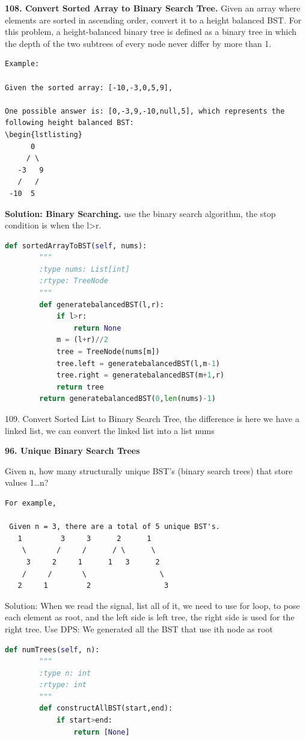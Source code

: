 \documentclass[../main.tex]{subfiles}
\begin{document}
\begin{examples}[resume]
\item \textbf{108. Convert Sorted Array to Binary Search Tree.} Given an array where elements are sorted in ascending order, convert it to a height balanced BST. For this problem, a height-balanced binary tree is defined as a binary tree in which the depth of the two subtrees of every node never differ by more than 1.
\begin{lstlisting}[numbers=none]
Example:

Given the sorted array: [-10,-3,0,5,9],

One possible answer is: [0,-3,9,-10,null,5], which represents the following height balanced BST:
\begin{lstlisting}
      0
     / \
   -3   9
   /   /
 -10  5
\end{lstlisting}

\textbf{Solution: Binary Searching.} use the binary search algorithm, the stop condition is when the l>r.
\begin{lstlisting}[language = Python]
def sortedArrayToBST(self, nums):
        """
        :type nums: List[int]
        :rtype: TreeNode
        """
        def generatebalancedBST(l,r):
            if l>r:
                return None
            m = (l+r)//2
            tree = TreeNode(nums[m])
            tree.left = generatebalancedBST(l,m-1)
            tree.right = generatebalancedBST(m+1,r)
            return tree
        return generatebalancedBST(0,len(nums)-1)
\end{lstlisting}

109. Convert Sorted List to Binary Search Tree, the difference is here we have a linked list, we can convert the linked list into a list nums

\item \textbf{96. Unique Binary Search Trees}

Given n, how many structurally unique BST’s (binary search trees) that store values 1…n?
\begin{lstlisting}[numbers=none]
For example,

 Given n = 3, there are a total of 5 unique BST's.
   1         3     3      2      1
    \       /     /      / \      \
     3     2     1      1   3      2
    /     /       \                 \
   2     1         2                 3
\end{lstlisting}

Solution: When we read the signal, list all of it, we need to use for loop, to pose each element as root, and the left side is left tree, the right side is used for the right tree. Use DPS: We generated all the BST that use ith node as root
\begin{lstlisting}[language = Python]
def numTrees(self, n):
        """
        :type n: int
        :rtype: int
        """ 
        def constructAllBST(start,end):
            if start>end:
                return [None]
            

\end{lstlisting}
\end{examples}
\end{document}
